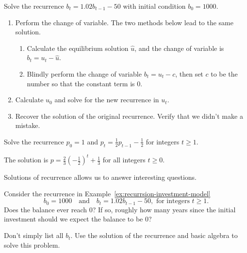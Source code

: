 \documentclass[../main.tex]{subfiles}
\begin{document}
\begin{example}
  Solve the recurrence \(b_{t} = 1.02 b_{t-1} - 50\) with initial condition \(b_{0} = 1000\).

  \begin{enumerate}[wide, label={Step~(\arabic*).}]
    \item Perform the change of variable. The two methods below lead to the same solution.
      \begin{enumerate}[label={(\alph*)}]
        \item Calculate the equilibrium solution \(\hat{u}\), and the change of variable is \(b_{t} = u_{t} - \hat{u}\).
        \item Blindly perform the change of variable \(b_{t} = u_{t} - c\), then set \(c\) to be the number so that the constant term is \(0\).
      \end{enumerate}

    \item Calculate \(u_{0}\) and solve for the new recurrence in \(u_{t}\). 

    \item Recover the solution of the original recurrence. Verify that we didn't make a mistake.
  \end{enumerate}
\end{example}
\clearpage

\begin{example}
  Solve the recurrence \(p_{0} = 1\) and \(p_{t} = \frac{1}{2} p_{t-1} - \frac{1}{2}\) for integers \(t \ge 1\).


  {\footnotesize The solution is \(p = \frac{2}{3} \left( -\frac{1}{2} \right)^{t} + \frac{1}{3}\) for all integers \(t \ge 0\).}
\end{example}

\clearpage

Solutions of recurrence allows us to answer interesting questions. 
\begin{example}
  Consider the recurrence in Example~\ref{ex:recurrsion-investment-model} 
  \[
    b_{0} = 1000 \quad\text{and}\quad b_{t} = 1.02 b_{t-1} - 50, \text{ for integers } t \ge 1. 
  \] 
  Does the balance ever reach \(0\)? If so, roughly how many years since the initial investment should we expect the balance to be \(0\)? 
  
  Don't simply list all \(b_{t}\). Use the solution of the recurrence and basic algebra to solve this problem.
\end{example}
\end{document}
